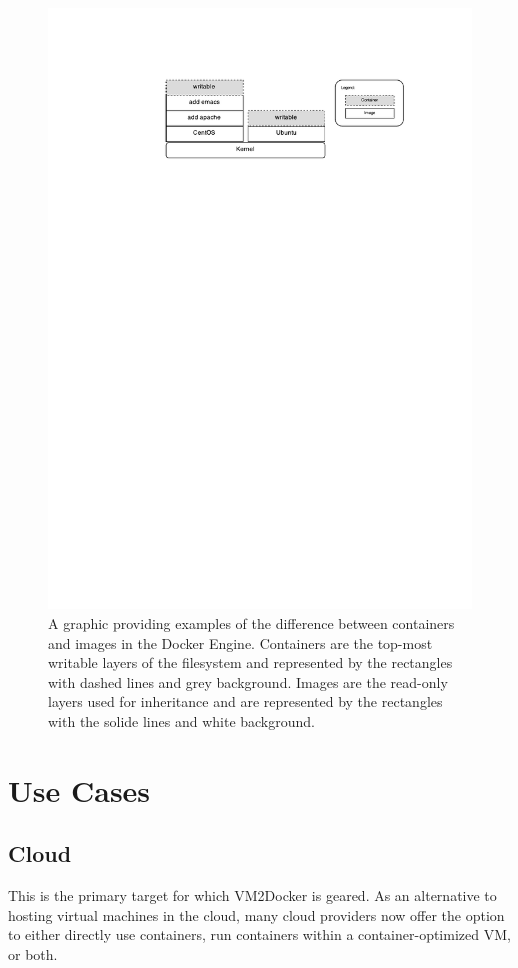 \begin{figure}[h]
\centering
    \includegraphics[width=1.0\textwidth]{cvimage.pdf}
    \caption{A graphic providing examples of the difference between containers and images in the Docker Engine. Containers are the top-most writable layers of the filesystem and represented by the rectangles with dashed lines and grey background. Images are the read-only layers used for inheritance and are represented by the rectangles with the solide lines and white background.}
\label{ch2:imagevcontainers}
\end{figure}

\section{Use Cases}\label{ch2:usecase}
\subsection{Cloud}
This is the primary target for which VM2Docker is geared. As an alternative to hosting virtual machines in the cloud, many cloud providers now offer the option to either directly use containers, run containers within a container-optimized VM, or both.

